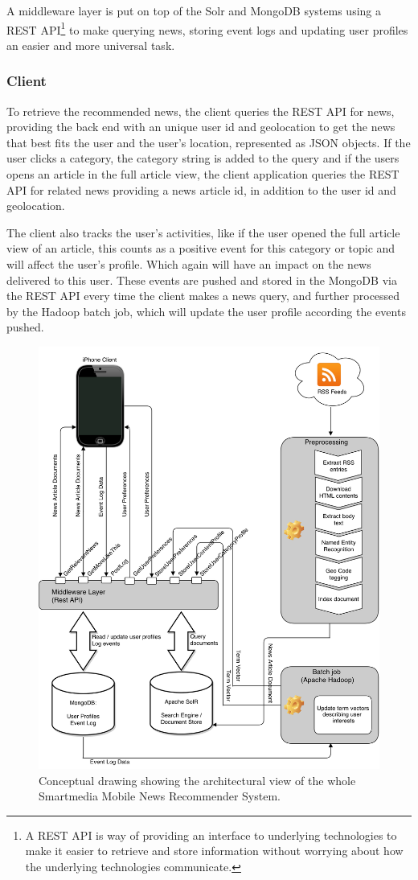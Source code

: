 A middleware layer is put on top of the Solr and MongoDB systems using a REST API\footnote{A REST API is way of providing an interface to underlying technologies to make it easier to retrieve and store information without worrying about how the underlying technologies communicate.} to make querying news, storing event logs and updating user profiles an easier and more universal task.

\subsubsection{Client}
To retrieve the recommended news, the client queries the REST API for news, providing the back end with an unique user id and geolocation to get the news that best fits the user and the user's location, represented as JSON objects. If the user clicks a category, the category string is added to the query and if the users opens an article in the full article view, the client application queries the REST API for related news providing a news article id, in addition to the user id and geolocation.

The client also tracks the user's activities, like if the user opened the full article view of an article, this counts as a positive event for this category or topic and will affect the user's profile. Which again will have an impact on the news delivered to this user. These events are pushed and stored in the MongoDB via the REST API every time the client makes a news query, and further processed by the Hadoop batch job, which will update the user profile according the events pushed.

\begin{figure}[!htbp]
\centering
\includegraphics[width=150mm]{GFX/tech/newsAppArchitecture.png}
\caption{Conceptual drawing showing the architectural view of the whole Smartmedia Mobile News Recommender System.}
\label{tech_news_app_architectural_view}
\end{figure}
